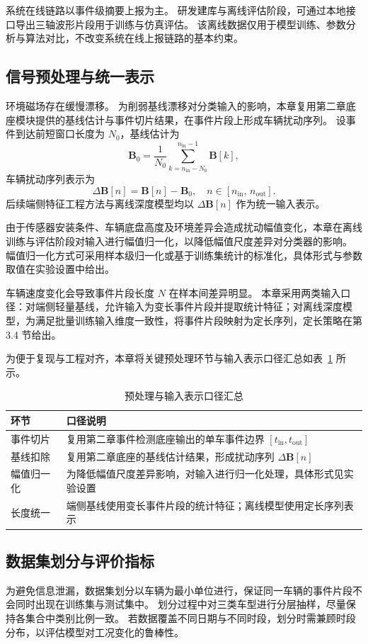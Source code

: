 \documentclass{xdupgthesis}
\begin{document}
系统在线链路以事件级摘要上报为主。
研发建库与离线评估阶段，可通过本地接口导出三轴波形片段用于训练与仿真评估。
该离线数据仅用于模型训练、参数分析与算法对比，不改变系统在线上报链路的基本约束。

\subsection{信号预处理与统一表示}
环境磁场存在缓慢漂移。
为削弱基线漂移对分类输入的影响，本章复用第二章底座模块提供的基线估计与事件切片结果，在事件片段上形成车辆扰动序列。
设事件到达前短窗口长度为 $N_0$，基线估计为
\[
\mathbf{B}_0=\frac{1}{N_0}\sum_{k=n_{\mathrm{in}}-N_0}^{n_{\mathrm{in}}-1}\mathbf{B}[k],
\]
车辆扰动序列表示为
\[
\Delta\mathbf{B}[n]=\mathbf{B}[n]-\mathbf{B}_0,\quad n\in[n_{\mathrm{in}},\,n_{\mathrm{out}}].
\]
后续端侧特征工程方法与离线深度模型均以 $\Delta\mathbf{B}[n]$ 作为统一输入表示。

由于传感器安装条件、车辆底盘高度及环境差异会造成扰动幅值变化，本章在离线训练与评估阶段对输入进行幅值归一化，以降低幅值尺度差异对分类器的影响。
幅值归一化方式可采用样本级归一化或基于训练集统计的标准化，具体形式与参数取值在实验设置中给出。

车辆速度变化会导致事件片段长度 $N$ 在样本间差异明显。
本章采用两类输入口径：对端侧轻量基线，允许输入为变长事件片段并提取统计特征；对离线深度模型，为满足批量训练输入维度一致性，将事件片段映射为定长序列，定长策略在第 3.4 节给出。

为便于复现与工程对齐，本章将关键预处理环节与输入表示口径汇总如表~\ref{tab:ch3_preprocess} 所示。

\begin{table}[htbp]
\centering
\caption{预处理与输入表示口径汇总}
\label{tab:ch3_preprocess}
\begin{tabular}{p{3.0cm}p{9.5cm}}
\hline
环节 & 口径说明 \\
\hline
事件切片 & 复用第二章事件检测底座输出的单车事件边界 $[t_{\mathrm{in}},t_{\mathrm{out}}]$ \\
基线扣除 & 复用第二章底座的基线估计结果，形成扰动序列 $\Delta\mathbf{B}[n]$ \\
幅值归一化 & 为降低幅值尺度差异影响，对输入进行归一化处理，具体形式见实验设置 \\
长度统一 & 端侧基线使用变长事件片段的统计特征；离线模型使用定长序列表示 \\
\hline
\end{tabular}
\end{table}

\subsection{数据集划分与评价指标}
为避免信息泄漏，数据集划分以车辆为最小单位进行，保证同一车辆的事件片段不会同时出现在训练集与测试集中。
划分过程中对三类车型进行分层抽样，尽量保持各集合中类别比例一致。
若数据覆盖不同日期与不同时段，划分时需兼顾时段分布，以评估模型对工况变化的鲁棒性。
\end{document}
